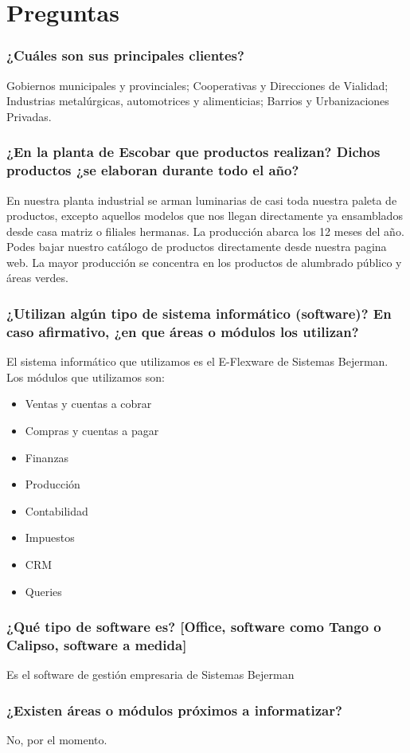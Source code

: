 \section{Preguntas}

\subsubsection*{¿Cuáles son sus principales clientes?}
Gobiernos municipales y provinciales; Cooperativas y Direcciones de Vialidad; Industrias metalúrgicas, automotrices y alimenticias; Barrios y Urbanizaciones Privadas.

\subsubsection*{¿En la planta de Escobar que productos realizan? Dichos productos ¿se elaboran durante todo el año? }
En nuestra planta industrial se arman luminarias de casi toda nuestra paleta de productos, excepto aquellos modelos que nos llegan directamente ya ensamblados desde casa matriz o filiales hermanas. La producción abarca los 12 meses del año.
Podes bajar nuestro catálogo de productos directamente desde nuestra pagina web. La mayor producción se concentra en los productos de alumbrado público y áreas verdes. 

\subsubsection*{¿Utilizan algún tipo de sistema informático (software)? En caso afirmativo, ¿en que áreas o módulos los utilizan?}
El sistema informático que utilizamos es el E-Flexware de Sistemas Bejerman.  Los módulos que utilizamos son:
\begin{itemize}
	\item Ventas y cuentas a cobrar
	\item Compras y cuentas a pagar
	\item Finanzas
	\item Producción
	\item Contabilidad
	\item Impuestos
	\item CRM
	\item Queries
\end{itemize}

\subsubsection*{¿Qué tipo de software es? [Office, software como Tango o Calipso, software a medida]}
Es el software de gestión empresaria de Sistemas Bejerman

\subsubsection*{¿Existen áreas o módulos próximos a informatizar?}
No, por el momento.